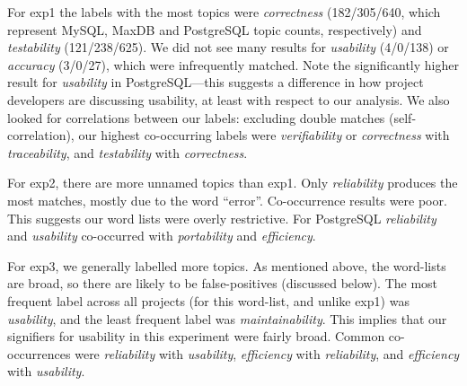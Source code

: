 \documentclass[smallextended]{svjour3}       %
\begin{document}
\begin{table}
\end{table}

For \textsf{exp1} the labels with the most topics
were
\emph{correctness} (182/305/640, which represent MySQL, MaxDB and PostgreSQL topic counts, respectively) and \emph{testability} (121/238/625). 
We did not see many results for \emph{usability} (4/0/138) or
\emph{accuracy} (3/0/27), which were infrequently matched. Note the significantly higher result for \emph{usability} in PostgreSQL---this suggests a difference in how project developers are discussing usability, at least with respect to our analysis.
We also looked for correlations between our labels: excluding double
matches (self-correlation), our highest co-occurring labels were
\emph{verifiability} or \emph{correctness}
with \emph{traceability}, and \emph{testability} with \emph{correctness}.%

For \textsf{exp2}, there are more unnamed topics than \textsf{exp1}. 
Only \emph{reliability} produces the most matches, mostly due to the word ``error''. 
Co-occurrence results were poor. This suggests our word lists were overly restrictive.
For PostgreSQL \emph{reliability} and  \emph{usability} co-occurred
with \emph{portability} and \emph{efficiency}.


For \textsf{exp3}, we generally labelled more topics. 
As mentioned above, the word-lists are broad, so there are likely to be false-positives (discussed below). 
The most frequent label across all projects (for this word-list, and unlike \textsf{exp1}) was \emph{usability}, and the
least frequent label was \emph{maintainability}. This implies that our signifiers for usability in this experiment were fairly broad.
Common co-occurrences were \emph{reliability} with \emph{usability}, \emph{efficiency} with \emph{reliability}, and \emph{efficiency} with \emph{usability}.
\end{document}
